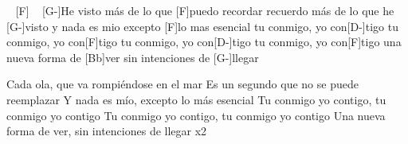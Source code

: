 
\begin{guitar}
[G-] ~ [F] ~
[G-]He visto más de lo que [F]puedo recordar
recuerdo más de lo que he [G-]visto
y nada es mio excepto [F]lo mas esencial
tu conmigo, yo con[D-]tigo
tu conmigo, yo con[F]tigo
tu conmigo, yo con[D-]tigo
tu conmigo, yo con[F]tigo
una nueva forma de [Bb]ver
sin intenciones de [G-]llegar

Cada ola, que va rompiéndose en el mar
Es un segundo que no se puede reemplazar
Y nada es mío, excepto lo más esencial
Tu conmigo yo contigo, tu conmigo yo contigo
Tu conmigo yo contigo, tu conmigo yo contigo
Una nueva forma de ver, sin intenciones de llegar x2

\end{guitar}